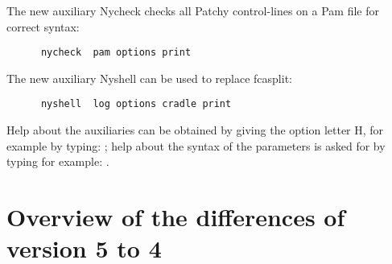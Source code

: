 The new auxiliary Nycheck checks all Patchy control-lines on a Pam file
for correct syntax:

\begin{verbatim}
      nycheck  pam options print
\end{verbatim}

The new auxiliary Nyshell can be used to replace fcasplit:

\begin{verbatim}
      nyshell  log options cradle print
\end{verbatim}

Help about the auxiliaries can be obtained by giving the option letter H,
for example by typing: ; help about the syntax of the
parameters is asked for by typing for example: .


\section{Overview of the differences of version 5 to 4}
\label{sec:overview}

\renewcommand{\labelenumi}{\ref{sec:overview}.\theenumi)\ }

